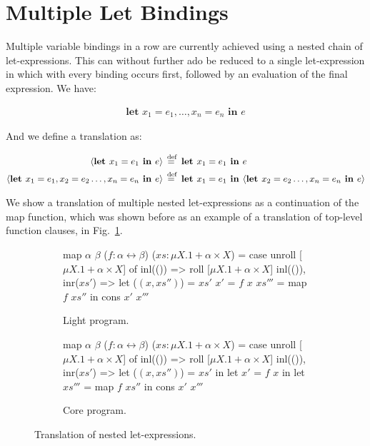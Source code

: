 \section{Multiple Let Bindings}

Multiple variable bindings in a row are currently achieved using a nested chain
of let-expressions. This can without further ado be reduced to a single
let-expression in which with every binding occurs first, followed by an
evaluation of the final expression. We have:

\begin{align*}
  \textbf{let } x_1 = e_1, \dots, x_n = e_n \textbf{ in } e
\end{align*}

And we define a translation as:

\begin{align*}
  \langle \textbf{let } x_1 = e_1 \textbf{ in } e \rangle &\stackrel{\>\text{def}}{=}\> \textbf{let } x_1 = e_1 \textbf{ in } e \\
  \langle \textbf{let } x_1 = e_1, x_2 = e_2 \dots, x_n = e_n \textbf{ in } e \rangle &\stackrel{\>\text{def}}{=}\>
  \textbf{let } x_1 = e_1 \textbf{ in } \langle \textbf{let } x_2 = e_2 \dots, x_n = e_n \textbf{ in } e \rangle
\end{align*}

We show a translation of multiple nested let-expressions as a continuation of
the map function, which was shown before as an example of a translation of
top-level function clauses, in Fig.~\ref{fig:let_translation}.

\begin{figure}[htp]
  \centering
  \begin{subfigure}[b]{0.90\textwidth}
    \begin{rfuncodenum}
map $\alpha$ $\beta$ ($f: \alpha \leftrightarrow \beta$) ($xs: \mu X . 1 + \alpha \times X$) = case unroll [$\mu X . 1 + \alpha \times X$] of
  inl(()) => roll [$\mu X . 1 + \alpha \times X$] inl(()),
  inr($xs'$) => let ($(x, xs'')$) = $xs'$
                    $x'$ = $f$ $x$
                    $xs'''$ = map $f$ $xs''$
               in cons $x'$ $x'''$
      \end{rfuncodenum}
    \caption{Light program.}
  \end{subfigure}
  \begin{subfigure}[b]{0.90\textwidth}
    \begin{rfuncodenum}
map $\alpha$ $\beta$ ($f: \alpha \leftrightarrow \beta$) ($xs: \mu X . 1 + \alpha \times X$) = case unroll [$\mu X . 1 + \alpha \times X$] of
  inl(()) => roll [$\mu X . 1 + \alpha \times X$] inl(()),
  inr($xs'$) => let ($(x, xs'')$) = $xs'$
               in let $x'$ = $f$ $x$
                   in let $xs'''$ = map $f$ $xs''$
                       in cons $x'$ $x'''$
      \end{rfuncodenum}
    \caption{Core program.}
  \end{subfigure}
  \caption{Translation of nested let-expressions.}\label{fig:let_translation}
\end{figure}
